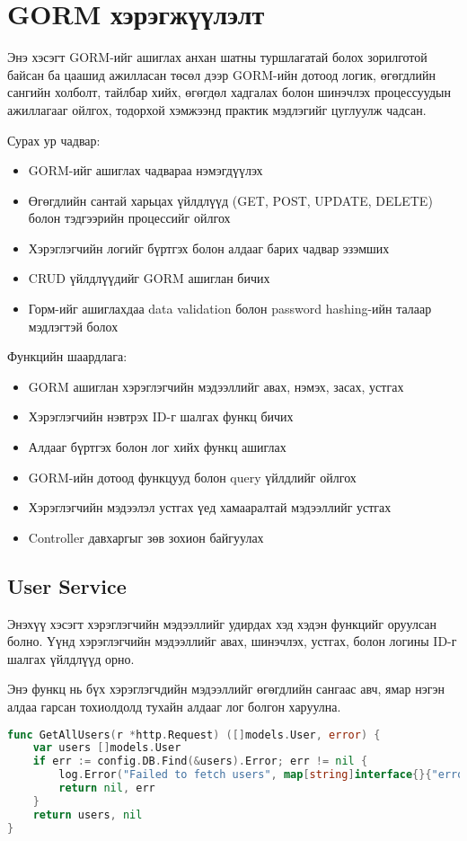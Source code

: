 \section{GORM хэрэгжүүлэлт}

Энэ хэсэгт GORM-ийг ашиглах анхан шатны туршлагатай болох зорилготой байсан ба цаашид ажилласан төсөл дээр GORM-ийн дотоод логик, өгөгдлийн сангийн холболт, тайлбар хийх, өгөгдөл хадгалах болон шинэчлэх процессуудын ажиллагааг ойлгох, тодорхой хэмжээнд практик мэдлэгийг цуглуулж чадсан.

Сурах ур чадвар: 
\begin{itemize} 
	\item GORM-ийг ашиглах чадвараа нэмэгдүүлэх 
	\item Өгөгдлийн сантай харьцах үйлдлүүд (GET, POST, UPDATE, DELETE) болон тэдгээрийн процессийг ойлгох 
	\item Хэрэглэгчийн логийг бүртгэх болон алдааг барих чадвар эзэмших 
	\item CRUD үйлдлүүдийг GORM ашиглан бичих 
	\item Горм-ийг ашиглахдаа data validation болон password hashing-ийн талаар мэдлэгтэй болох \end{itemize}

Функцийн шаардлага: 
\begin{itemize} 
	\item GORM ашиглан хэрэглэгчийн мэдээллийг авах, нэмэх, засах, устгах 
	\item Хэрэглэгчийн нэвтрэх ID-г шалгах функц бичих 
	\item Алдааг бүртгэх болон лог хийх функц ашиглах 
	\item GORM-ийн дотоод функцууд болон query үйлдлийг ойлгох 
	\item Хэрэглэгчийн мэдээлэл устгах үед хамааралтай мэдээллийг устгах
	\item Controller  давхаргыг зөв зохион байгуулах
\end{itemize}
	
\subsection{User Service}

Энэхүү хэсэгт хэрэглэгчийн мэдээллийг удирдах хэд хэдэн функцийг оруулсан болно. Үүнд хэрэглэгчийн мэдээллийг авах, шинэчлэх, устгах, болон логины ID-г шалгах үйлдлүүд орно.

Энэ функц нь бүх хэрэглэгчдийн мэдээллийг өгөгдлийн сангаас авч, ямар нэгэн алдаа гарсан тохиолдолд тухайн алдааг лог болгон харуулна.
\begin{lstlisting}[language=Go, caption=Get All Users Service, frame=single]
func GetAllUsers(r *http.Request) ([]models.User, error) {
	var users []models.User
	if err := config.DB.Find(&users).Error; err != nil {
		log.Error("Failed to fetch users", map[string]interface{}{"error": err.Error()}, r)
		return nil, err
	}
	return users, nil
}
\end{lstlisting}


